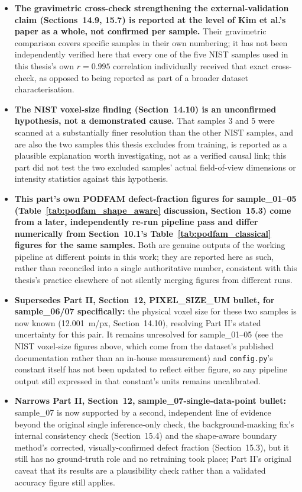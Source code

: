 \begin{itemize}
  signal concentrates, not a validated architectural claim; a different crop, sample, or attribution
  method could in principle produce a different relative ranking among the nine blocks.
\item \textbf{The gravimetric cross-check strengthening the external-validation claim
  (Sections~14.9, 15.7) is reported at the level of Kim et al.'s paper as a whole, not confirmed
  per sample.} Their gravimetric comparison covers specific samples in their own numbering; it has not
  been independently verified here that every one of the five NIST samples used in this thesis's own
  $r = 0.995$ correlation individually received that exact cross-check, as opposed to being reported
  as part of a broader dataset characterisation.
\item \textbf{The NIST voxel-size finding (Section~14.10) is an unconfirmed hypothesis, not a
  demonstrated cause.} That samples 3 and 5 were scanned at a substantially finer resolution than the
  other NIST samples, and are also the two samples this thesis excludes from training, is reported as a
  plausible explanation worth investigating, not as a verified causal link; this part did not test the
  two excluded samples' actual field-of-view dimensions or intensity statistics against this
  hypothesis.
\item \textbf{This part's own PODFAM defect-fraction figures for sample\_01--05
  (Table~\ref{tab:podfam_shape_aware} discussion, Section~15.3) come from a later, independently re-run
  pipeline pass and differ numerically from Section~10.1's Table~\ref{tab:podfam_classical} figures for
  the same samples.} Both are genuine outputs of the working pipeline at different points in this
  work; they are reported here as such, rather than reconciled into a single authoritative number,
  consistent with this thesis's practice elsewhere of not silently merging figures from different runs.
\item \textbf{Supersedes Part II, Section~12, PIXEL\_SIZE\_UM bullet, for sample\_06/07 specifically:}
  the physical voxel size for these two samples is now known (12.001~\textmu m/px,
  Section~14.10), resolving Part II's stated uncertainty for this pair. It remains unresolved for
  sample\_01--05 (see the NIST voxel-size figures above, which come from the dataset's published
  documentation rather than an in-house measurement) and \texttt{config.py}'s 
  constant itself has not been updated to reflect either figure, so any pipeline output still expressed
  in that constant's units remains uncalibrated.
\item \textbf{Narrows Part II, Section~12, sample\_07-single-data-point bullet:} sample\_07 is now
  supported by a second, independent line of evidence beyond the original single inference-only check,
  the background-masking fix's internal consistency check (Section~15.4) and the shape-aware boundary
  method's corrected, visually-confirmed defect fraction (Section~15.3), but it still has no
  ground-truth role and no retraining took place; Part II's original caveat that its results are a
  plausibility check rather than a validated accuracy figure still applies.
\end{itemize}
